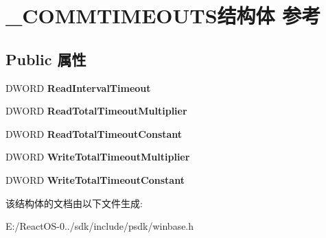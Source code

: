 \hypertarget{struct___c_o_m_m_t_i_m_e_o_u_t_s}{}\section{\+\_\+\+C\+O\+M\+M\+T\+I\+M\+E\+O\+U\+T\+S结构体 参考}
\label{struct___c_o_m_m_t_i_m_e_o_u_t_s}
\subsection*{Public 属性}
\begin{DoxyCompactItemize}
\item 
\mbox{\label{struct___c_o_m_m_t_i_m_e_o_u_t_s_a99854abea5eaf518a45970599a6eb6b4}} 
D\+W\+O\+RD {\bfseries Read\+Interval\+Timeout}
\item 
\mbox{\label{struct___c_o_m_m_t_i_m_e_o_u_t_s_a2f223d6d8ac526456978bf73aee74019}} 
D\+W\+O\+RD {\bfseries Read\+Total\+Timeout\+Multiplier}
\item 
\mbox{\label{struct___c_o_m_m_t_i_m_e_o_u_t_s_a3449c330a793185164bcbf495ab9ce52}} 
D\+W\+O\+RD {\bfseries Read\+Total\+Timeout\+Constant}
\item 
\mbox{\label{struct___c_o_m_m_t_i_m_e_o_u_t_s_abbd5a7356968a21f1fb479675d2fb618}} 
D\+W\+O\+RD {\bfseries Write\+Total\+Timeout\+Multiplier}
\item 
\mbox{\label{struct___c_o_m_m_t_i_m_e_o_u_t_s_a14e04961fb2a976da2b6589c3fd38e4a}} 
D\+W\+O\+RD {\bfseries Write\+Total\+Timeout\+Constant}
\end{DoxyCompactItemize}


该结构体的文档由以下文件生成\+:\begin{DoxyCompactItemize}
\item 
E\+:/\+React\+O\+S-\/0../sdk/include/psdk/winbase.\+h\end{DoxyCompactItemize}
